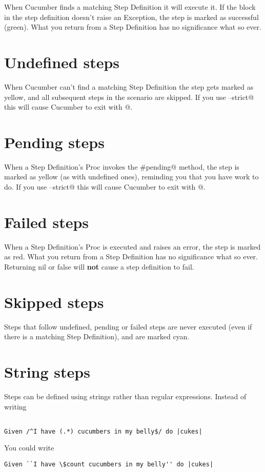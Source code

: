 \documentclass[10pt]{book}
\begin{document}
When Cucumber finds a matching Step Definition it will execute it. If the block in the step definition doesn't raise an Exception, the step is marked as successful (green). What you return from a Step Definition has no significance what so ever.

\section{Undefined steps}

When Cucumber can't find a matching Step Definition the step gets marked as yellow, and all subsequent steps in the scenario are skipped. If you use \verb@--strict@ this will cause Cucumber to exit with @.

\section{Pending steps}

When a Step Definition's Proc invokes the \verb@#pending@ method, the step is marked as yellow (as with undefined ones), reminding you that you have work to do. If you use \verb@--strict@ this will cause Cucumber to exit with @.

\section{Failed steps}

When a Step Definition's Proc is executed and raises an error, the step is marked as red. What you return from a Step Definition has no significance what so ever. Returning nil or false will \textbf{not} cause a step definition to fail.

\section{Skipped steps}

Steps that follow undefined, pending or failed steps are never executed (even if there is a matching Step Definition), and are marked cyan.

\section{String steps}

Steps can be defined using strings rather than regular expressions. Instead of writing

\begin{verbatim}

Given /^I have (.*) cucumbers in my belly$/ do |cukes|

\end{verbatim}
You could write
\begin{verbatim}
Given ``I have \$count cucumbers in my belly'' do |cukes|

\end{verbatim}
\end{document}
